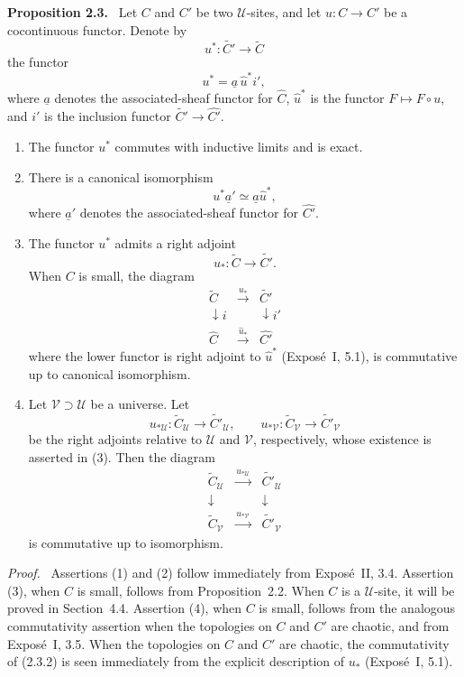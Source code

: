 \documentclass[11pt]{article}
\newcommand{\U}{\mathcal{U}}
\newcommand{\V}{\mathcal{V}}
\newenvironment{statement}[1]{\par\medskip\noindent\textbf{#1.}\ }{\par\medskip}
\newenvironment{prooftext}{\par\noindent\emph{Proof.}\ }{\par\medskip}
\begin{document}
\begin{statement}{Proposition 2.3}
Let \(C\) and \(C'\) be two \(\U\)-sites, and let \(u:C\to C'\) be a cocontinuous functor. Denote by
\[
u^*:\widetilde {C'}\longrightarrow\widetilde C
\]
the functor
\[
u^*=\underline a\,\widehat u^*i',
\]
where \(\underline a\) denotes the associated-sheaf functor for \(\widehat C\), \(\widehat u^*\) is the functor \(F\mapsto F\circ u\), and \(i'\) is the inclusion functor \(\widetilde {C'}\to\widehat {C'}\).
\begin{enumerate}[label=\arabic*)]
\item The functor \(u^*\) commutes with inductive limits and is exact.

\item There is a canonical isomorphism
\[
u^*\underline a'\simeq\underline a\widehat u^*,
\]
where \(\underline a'\) denotes the associated-sheaf functor for \(\widehat {C'}\).

\item The functor \(u^*\) admits a right adjoint
\[
u_*:\widetilde C\longrightarrow\widetilde {C'}.
\]
When \(C\) is small, the diagram
\[
\begin{array}{ccc}
\widetilde C&\xrightarrow{\ u_*\ }&\widetilde {C'}\\
\downarrow{\scriptstyle i}&&\downarrow{\scriptstyle i'}\\
\widehat C&\xrightarrow{\ \widehat u_*\ }&\widehat {C'}
\end{array}
\tag{2.3.1}
\]
where the lower functor is right adjoint to \(\widehat u^*\) (Expos\'e~I, 5.1), is commutative up to canonical isomorphism.

\item Let \(\V\supset\U\) be a universe. Let
\[
u_{*\U}:\widetilde C_{\U}\to\widetilde {C'}_{\U},
\qquad
u_{*\V}:\widetilde C_{\V}\to\widetilde {C'}_{\V}
\]
be the right adjoints relative to \(\U\) and \(\V\), respectively, whose existence is asserted in (3). Then the diagram
\[
\begin{array}{ccc}
\widetilde C_{\U}&\xrightarrow{\ u_{*\U}\ }&\widetilde {C'}_{\U}\\
\downarrow&&\downarrow\\
\widetilde C_{\V}&\xrightarrow{\ u_{*\V}\ }&\widetilde {C'}_{\V}
\end{array}
\tag{2.3.2}
\]
is commutative up to isomorphism.
\end{enumerate}
\end{statement}

\begin{prooftext}
Assertions (1) and (2) follow immediately from Expos\'e~II, 3.4. Assertion (3), when \(C\) is small, follows from Proposition~2.2. When \(C\) is a \(\U\)-site, it will be proved in Section~4.4. Assertion (4), when \(C\) is small, follows from the analogous commutativity assertion when the topologies on \(C\) and \(C'\) are chaotic, and from Expos\'e~I, 3.5. When the topologies on \(C\) and \(C'\) are chaotic, the commutativity of (2.3.2) is seen immediately from the explicit description of \(u_*\) (Expos\'e~I, 5.1).
\end{prooftext}
\end{document}
